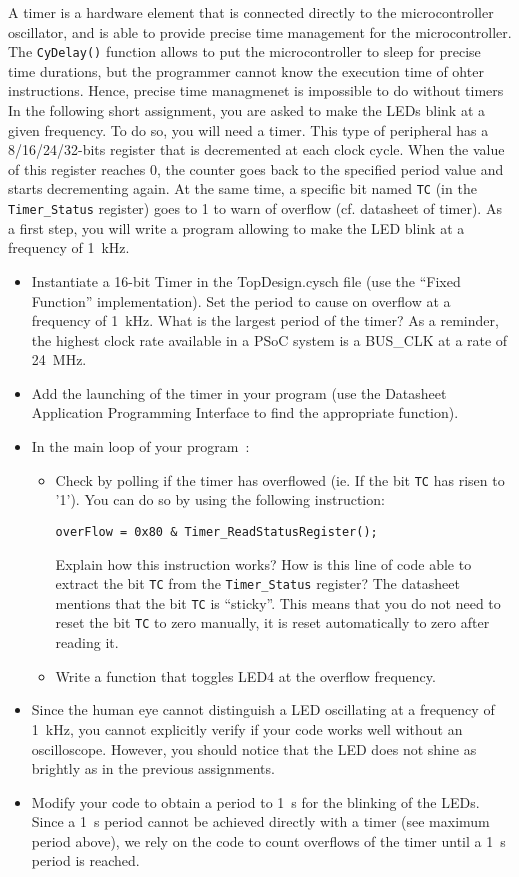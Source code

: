 A timer is a hardware element that is connected directly to the microcontroller oscillator, and is able to provide precise time management for the microcontroller. The \texttt{CyDelay()} function allows to put the microcontroller to sleep for precise time durations, but the programmer cannot know the execution time of ohter instructions. Hence, precise time managmenet is impossible to do without timers 
\\
In the following short assignment, you are asked to make the LEDs blink at a given frequency. To do so, you will need a timer. This type of peripheral has a 8/16/24/32-bits register that is decremented at each clock cycle. When the value of this register reaches 0, the counter goes back to the specified period value and starts decrementing again. At the same time, a specific bit named \texttt{TC} (in the \texttt{Timer\_Status} register) goes to 1 to warn of overflow (cf. datasheet of timer). As a first step, you will write a program allowing to make the LED blink at a frequency of 1~kHz.
\begin{itemize}
	\item Instantiate a 16-bit Timer in the TopDesign.cysch file (use the ``Fixed Function'' implementation). Set the period to cause on overflow at a frequency of 1~kHz. What is the largest period of the timer? As a reminder, the highest clock rate available in a PSoC system is a BUS\_CLK at a rate of 24~MHz.
	\item Add the launching of the timer in your program (use the Datasheet Application Programming Interface to find the appropriate function). 
	\item In the main loop of your program~:
	\begin{itemize}
		\item Check by polling if the timer has overflowed (ie. If the bit \texttt{TC} has risen to '1'). You can do so by using the following instruction: 
\begin{lstlisting}[style=customc]
overFlow = 0x80 & Timer_ReadStatusRegister(); 
\end{lstlisting}
			Explain how this instruction works? How is this line of code able to extract the bit \texttt{TC} from the \texttt{Timer\_Status} register? The datasheet mentions that the bit \texttt{TC} is ``sticky''. This means that you do not need to reset the bit \texttt{TC} to zero manually, it is reset automatically to zero after reading it.  
		\item Write a function that toggles LED4 at the overflow frequency. 
	\end{itemize}
	\item Since the human eye cannot distinguish a LED oscillating at a frequency of 1~kHz, you cannot explicitly verify if your code works well without an oscilloscope. However, you should notice that the LED does not shine as brightly as in the previous assignments. 
	\item Modify your code to obtain a period to 1~s for the blinking of the LEDs. Since a 1~s period cannot be achieved directly with a timer (see maximum period above), we rely on the code to count overflows of the timer until a 1~s period is reached. 
\end{itemize}
